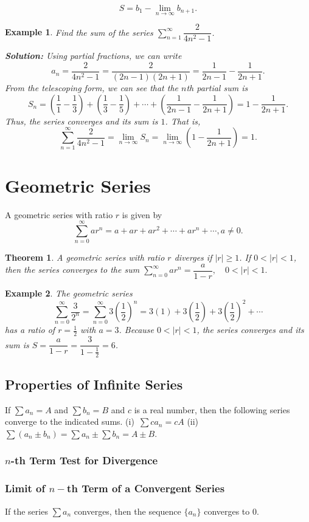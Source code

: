 \documentclass[titlepage,a4paper,12pt]{report}
\newtheorem{example}{Example}[section]
\newtheorem{theorem}{Theorem}[section]
\begin{document}
\[S=b_1-\lim _{n\rightarrow \infty} b_{n+1}.\]
\begin{example}
Find the sum of the series $\displaystyle \sum _{n=1}^\infty \dfrac{2}{4n^2-1}$.

\noindent \textbf{Solution:} Using partial fractions, we can write 
\[a_n=\dfrac{2}{4n^2-1}=\dfrac{2}{(2n-1)(2n+1)}=\dfrac{1}{2n-1}-\dfrac{1}{2n+1}.\]
From the telescoping form, we can see that the $n$th partial sum is 
\[S_n=\left(\dfrac{1}{1}-\dfrac{1}{3}\right)+\left(\dfrac{1}{3}-\dfrac{1}{5}\right)+\cdots +\left(\dfrac{1}{2n-1}-\dfrac{1}{2n+1}\right)=1-\dfrac{1}{2n+1}.\] Thus, the series converges and its sum is $1$. That is,
\[\sum _{n=1}^\infty \dfrac{2}{4n^2-1}=\lim _{n\rightarrow \infty} S_n=\lim _{n\rightarrow \infty}\left(1-\dfrac{1}{2n+1}\right)=1.\] 
\end{example}
\section{Geometric Series}
A geometric series with ratio $r$ is given by 
\[\sum _{n=0}^\infty ar^n =a+ar+ar^2+\cdots +ar^n + \cdots , a\neq 0.\]
\begin{theorem}
A geometric series with ratio $r$ diverges if $|r|\geq 1$. If $0<|r|<1$, then the series converges to the sum $\displaystyle \sum _{n=0}^\infty ar^n=\dfrac{a}{1-r}, \quad  0<|r|<1.$
\end{theorem}
\begin{example}
The geometric series 
\[\sum _{n=0}^\infty \dfrac{3}{2^n}=\sum _{n=0}^\infty 3\left(\dfrac{1}{2}\right)^n=3(1)+3\left(\dfrac{1}{2}\right)+3\left(\dfrac{1}{2}\right)^2+\cdots\]
has a ratio of $r=\frac{1}{2}$ with $a=3$. Because $0<|r|<1$, the series converges and its sum is $S=\dfrac{a}{1-r}=\dfrac{3}{1-\frac{1}{2}}=6$.
\end{example}
\subsection{Properties of Infinite Series}
If $\displaystyle \sum a_n =A$ and $\displaystyle \sum b_n=B$ and $c$ is a real number, then the following series converge to the indicated sums. (i)\, $\displaystyle \sum ca_n=cA$ \quad (ii)\, $\displaystyle \sum (a_n\pm b_n)=\sum a_n \pm \sum b_n =
A\pm B$. 
\subsubsection{$n$-th Term Test for Divergence}
\subsubsection{Limit of $n-$th Term of a Convergent Series}
If the series $\displaystyle \sum a_n$ converges, then the sequence $\{a_n\}$ converges to $0$.
\end{document}
